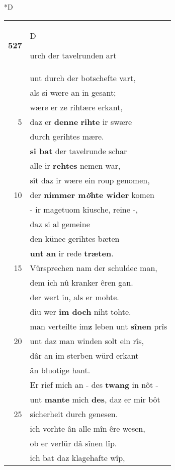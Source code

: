 \documentclass[8pt,a4paper,notitlepage]{article}
\begin{document}
\begin{table}[ht]
\begin{minipage}[t]{0.5\linewidth}
\small
\begin{center}*D
\end{center}
\begin{tabular}{rl}
\textbf{527} & \begin{large}D\end{large}urch der tavelrunden art\\ 
 & unt durch der botschefte vart,\\ 
 & als si wære an in gesant;\\ 
 & wære er ze rihtære erkant,\\ 
5 & daz er \textbf{denne} \textbf{rihte} ir swære\\ 
 & durch gerihtes mære.\\ 
 & \textbf{si bat} der tavelrunde schar\\ 
 & alle ir \textbf{rehtes} nemen war,\\ 
 & sît daz ir wære ein roup genomen,\\ 
10 & der \textbf{nimmer m\textit{ö}hte wider} komen\\ 
 & - ir magetuom kiusche, reine -,\\ 
 & daz si al gemeine\\ 
 & den künec gerihtes bæten\\ 
 & \textbf{unt} \textbf{an} ir rede \textbf{træten}.\\ 
15 & Vürsprechen nam der schuldec man,\\ 
 & dem ich nû kranker êren gan.\\ 
 & der wert in, als er mohte.\\ 
 & diu wer \textbf{im doch} niht tohte.\\ 
 & man verteilte im\textbf{z} leben unt \textbf{sînen} prîs\\ 
20 & unt daz man winden solt ein rîs,\\ 
 & dâr an im sterben würd erkant\\ 
 & ân bluotige hant.\\ 
 & Er rief mich an - des \textbf{twang} in nôt -\\ 
 & unt \textbf{mante} mich \textbf{des}, daz er mir bôt\\ 
25 & sicherheit durch genesen.\\ 
 & ich vorhte ân alle mîn êre wesen,\\ 
 & ob er verlür dâ sînen lîp.\\ 
 & ich bat daz klagehafte wîp,\\ 

\end{tabular}
\end{minipage}
\end{table}
\end{document}
